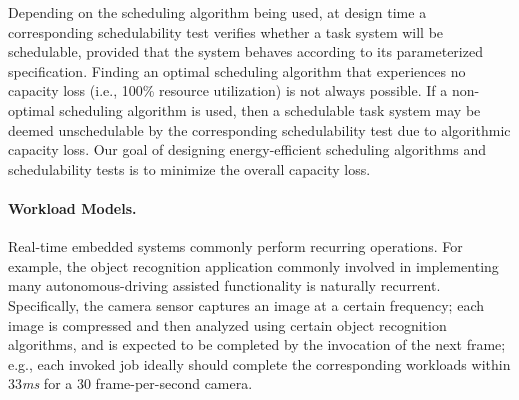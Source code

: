 Depending on the scheduling algorithm being used, at design time a corresponding schedulability test verifies whether a task system will be schedulable, provided that the system behaves according to its parameterized specification. Finding an optimal scheduling algorithm that experiences no capacity loss (i.e., 100\% resource utilization) is not always possible. If a non-optimal scheduling algorithm is used, then a schedulable task system may be deemed unschedulable by the corresponding schedulability test due to algorithmic capacity loss.
Our goal of designing energy-efficient scheduling algorithms and schedulability tests is to minimize the overall capacity loss.%


\vspace{-2mm} \paragraph{Workload Models.} Real-time embedded systems commonly perform recurring operations. For example, the object recognition application commonly involved in implementing many autonomous-driving assisted functionality is naturally recurrent. Specifically, the camera sensor captures an image at a certain frequency; each image is compressed and then analyzed using certain object recognition algorithms, and is expected to be completed by the invocation of the next frame; e.g., each invoked job ideally should complete the corresponding workloads within 33\textit{ms} for a 30 frame-per-second camera.  

